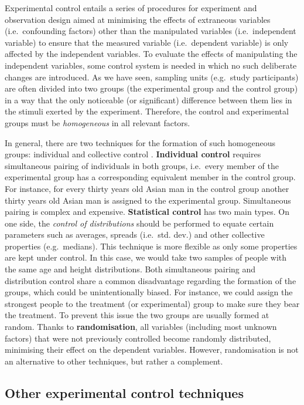 \documentclass[
]{book}
\begin{document}
Experimental control entails a series of procedures for experiment and observation design aimed at minimising the effects of extraneous variables (i.e.~confounding factors) other than the manipulated variables (i.e.~independent variable) to ensure that the measured variable (i.e.~dependent variable) is only affected by the independent variables. To evaluate the effects of manipulating the independent variables, some control system is needed in which no such deliberate changes are introduced. As we have seen, sampling units (e.g.~study participants) are often divided into two groups (the experimental group and the control group) in a way that the only noticeable (or significant) difference between them lies in the stimuli exerted by the experiment.
Therefore, the control and experimental groups must be \emph{homogeneous} in all relevant factors.

In general, there are two techniques for the formation of such homogeneous groups: individual and collective control \citep{bunge2017philosophy}. \textbf{Individual control} requires simultaneous pairing of individuals in both groups, i.e.~every member of the experimental group has a corresponding equivalent member in the control group. For instance, for every thirty years old Asian man in the control group another thirty years old Asian man is assigned to the experimental group. Simultaneous pairing is complex and expensive. \textbf{Statistical control} has two main types. On one side, the \emph{control of distributions} should be performed to equate certain parameters such as averages, spreads (i.e.~std. dev.) and other collective properties (e.g.~medians). This technique is more flexible as only some properties are kept under control. In this case, we would take two samples of people with the same age and height distributions. Both simultaneous pairing and distribution control share a common disadvantage regarding the formation of the groups, which could be unintentionally biased. For instance, we could assign the strongest people to the treatment (or experimental) group to make sure they bear the treatment. To prevent this issue the two groups are usually formed at random. Thanks to \textbf{randomisation}, all variables (including most unknown factors) that were not previously controlled become randomly distributed, minimising their effect on the dependent variables. However, randomisation is not an alternative to other techniques, but rather a complement.

\hypertarget{other-experimental-control-techniques}{%
\subsection{Other experimental control techniques}\label{other-experimental-control-techniques}}
\end{document}
